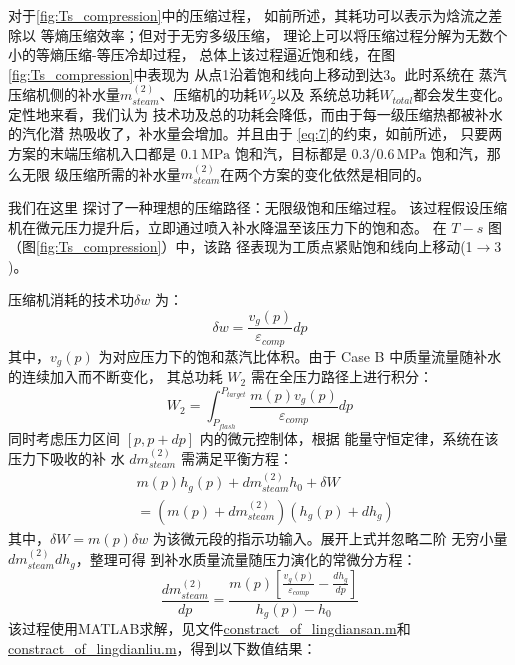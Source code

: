 \documentclass{thuemp}
\begin{document}
对于\ref{fig:Ts_compression}中的压缩过程，
如前所述，其耗功可以表示为焓流之差除以
等熵压缩效率；但对于无穷多级压缩，
理论上可以将压缩过程分解为无数个小的等熵压缩-等压冷却过程，
总体上该过程逼近饱和线，在图\ref{fig:Ts_compression}中表现为
从点1沿着饱和线向上移动到达3。此时系统在
蒸汽压缩机侧的补水量$m_{steam}^{(2)}$、压缩机的功耗$W_2$以及
系统总功耗$W_{total}$都会发生变化。定性地来看，我们认为
技术功及总的功耗会降低，而由于每一级压缩热都被补水的汽化潜
热吸收了，补水量会增加。并且由于
\ref{eq:7}的约束，如前所述，
只要两方案的末端压缩机入口都是
 $0.1\,\text{MPa}$ 饱和汽，目标都是 $0.3/0.6\,\text{MPa}$ 饱和汽，那么无限
 级压缩所需的补水量$m_{steam}^{(2)}$在两个方案的变化依然是相同的。

我们在这里
探讨了一种理想的压缩路径：无限级饱和压缩过程。
该过程假设压缩机在微元压力提升后，立即通过喷入补水降温至该压力下的饱和态。
在 $T-s$ 图（图\ref{fig:Ts_compression}）中，该路
径表现为工质点紧贴饱和线向上移动(1$\rightarrow 3$)。

压缩机消耗的技术功$\delta w$ 为：
\begin{equation}
    \delta w = \frac{v_g(p)}{\varepsilon_{comp}} dp
\end{equation}
其中，$v_g(p)$ 为对应压力下的饱和蒸汽比体积。由于 Case B 
中质量流量随补水的连续加入而不断变化，
其总功耗 $W_2$ 需在全压力路径上进行积分：
\begin{equation}
    W_2 = \int_{P_{flash}}^{P_{target}} \frac{m(p) v_g(p)}{\varepsilon_{comp}} dp
\end{equation}
同时考虑压力区间 $[p, p+dp]$ 内的微元控制体，根据
能量守恒定律，系统在该压力下吸收的补
水 $dm_{steam}^{(2)}$ 需满足平衡方程：
\begin{equation}
    \begin{aligned}
           & m(p)h_g(p) + dm_{steam}^{(2)} h_0 + \delta W \\&= (m(p) + dm_{steam}^{(2)})(h_g(p) + dh_g)
    \end{aligned}
\end{equation}
其中，$\delta W = m(p) \delta w$ 
    为该微元段的指示功输入。展开上式并忽略二阶
    无穷小量 $dm_{steam}^{(2)} dh_g$，整理可得
    到补水质量流量随压力演化的常微分方程：
    \begin{equation}\label{eq:dm2_dp}
        \frac{dm_{steam}^{(2)}}{dp} = \frac{m(p) \left[ \frac{v_g(p)}{\varepsilon_{comp}} - \frac{dh_g}{dp} \right]}{h_g(p) - h_0}
    \end{equation}
该过程使用MATLAB求解，见文件\url{constract_of_lingdiansan.m}和
\url{constract_of_lingdianliu.m}，得到以下数值结果：
\end{document}
